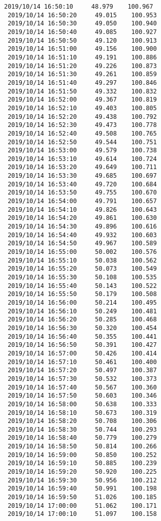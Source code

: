 \documentclass[11pt]{article}
\begin{document}
\begin{Verbatim}[commandchars=\\\{\}]
 2019/10/14 16:50:10     48.979    100.967
 2019/10/14 16:50:20     49.015    100.953
 2019/10/14 16:50:30     49.050    100.940
 2019/10/14 16:50:40     49.085    100.927
 2019/10/14 16:50:50     49.120    100.913
 2019/10/14 16:51:00     49.156    100.900
 2019/10/14 16:51:10     49.191    100.886
 2019/10/14 16:51:20     49.226    100.873
 2019/10/14 16:51:30     49.261    100.859
 2019/10/14 16:51:40     49.297    100.846
 2019/10/14 16:51:50     49.332    100.832
 2019/10/14 16:52:00     49.367    100.819
 2019/10/14 16:52:10     49.403    100.805
 2019/10/14 16:52:20     49.438    100.792
 2019/10/14 16:52:30     49.473    100.778
 2019/10/14 16:52:40     49.508    100.765
 2019/10/14 16:52:50     49.544    100.751
 2019/10/14 16:53:00     49.579    100.738
 2019/10/14 16:53:10     49.614    100.724
 2019/10/14 16:53:20     49.649    100.711
 2019/10/14 16:53:30     49.685    100.697
 2019/10/14 16:53:40     49.720    100.684
 2019/10/14 16:53:50     49.755    100.670
 2019/10/14 16:54:00     49.791    100.657
 2019/10/14 16:54:10     49.826    100.643
 2019/10/14 16:54:20     49.861    100.630
 2019/10/14 16:54:30     49.896    100.616
 2019/10/14 16:54:40     49.932    100.603
 2019/10/14 16:54:50     49.967    100.589
 2019/10/14 16:55:00     50.002    100.576
 2019/10/14 16:55:10     50.038    100.562
 2019/10/14 16:55:20     50.073    100.549
 2019/10/14 16:55:30     50.108    100.535
 2019/10/14 16:55:40     50.143    100.522
 2019/10/14 16:55:50     50.179    100.508
 2019/10/14 16:56:00     50.214    100.495
 2019/10/14 16:56:10     50.249    100.481
 2019/10/14 16:56:20     50.285    100.468
 2019/10/14 16:56:30     50.320    100.454
 2019/10/14 16:56:40     50.355    100.441
 2019/10/14 16:56:50     50.391    100.427
 2019/10/14 16:57:00     50.426    100.414
 2019/10/14 16:57:10     50.461    100.400
 2019/10/14 16:57:20     50.497    100.387
 2019/10/14 16:57:30     50.532    100.373
 2019/10/14 16:57:40     50.567    100.360
 2019/10/14 16:57:50     50.603    100.346
 2019/10/14 16:58:00     50.638    100.333
 2019/10/14 16:58:10     50.673    100.319
 2019/10/14 16:58:20     50.708    100.306
 2019/10/14 16:58:30     50.744    100.293
 2019/10/14 16:58:40     50.779    100.279
 2019/10/14 16:58:50     50.814    100.266
 2019/10/14 16:59:00     50.850    100.252
 2019/10/14 16:59:10     50.885    100.239
 2019/10/14 16:59:20     50.920    100.225
 2019/10/14 16:59:30     50.956    100.212
 2019/10/14 16:59:40     50.991    100.198
 2019/10/14 16:59:50     51.026    100.185
 2019/10/14 17:00:00     51.062    100.171
 2019/10/14 17:00:10     51.097    100.158

\end{Verbatim}
\end{document}
